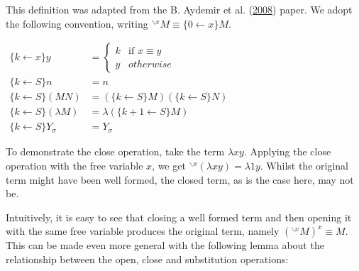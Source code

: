 \documentclass[a4paper, 12pt, twoside]{style/ociamthesis}
\theoremstyle{plain}
\theoremstyle{definition}
\newtheorem{Definition}{Definition}[chapter]
\newtheorem{Example}{Example}[chapter]
\theoremstyle{remark}
\newcommand{\cls}{{}^{\backslash x}}
\renewenvironment{Example}{\begin{OldExample}\begin{mdframed}[style=example, linecolor=yellow]}{\end{mdframed}\end{OldExample}}
\renewenvironment{Definition}{\begin{OldDefinition}\begin{mdframed}[style=example, linecolor=cyan]}{\end{mdframed}\end{OldDefinition}}
\begin{document}
\begin{Definition}[Close operation]

This definition was adapted from the B. Aydemir et al.
(\protect\hyperlink{ref-aydemir08}{2008}) paper. We adopt the following
convention, writing \(\cls M \equiv \{0 \leftarrow x\}M\).

\begin{center}
$\begin{aligned}
\{k \leftarrow x\}y &= \begin{cases}
k & \text{if }x \equiv y\\
y & otherwise
\end{cases}\\
\{k \leftarrow S\}n &= n\\
\{k \leftarrow S\}(MN) &= (\{k \leftarrow S\}M)(\{k \leftarrow S\}N)\\
\{k \leftarrow S\}(\lambda M) &= \lambda (\{k+1 \leftarrow S\}M)\\
\{k \leftarrow S\}Y_\sigma &= Y_\sigma
\end{aligned}$
\end{center}

\end{Definition}

\begin{Example}

To demonstrate the close operation, take the term \(\lambda xy\).
Applying the close operation with the free variable \(x\), we get
\(\cls (\lambda xy) = \lambda 1y\). Whilst the original term might have
been well formed, the closed term, as is the case here, may not be.

\end{Example}

Intuitively, it is easy to see that closing a well formed term and then
opening it with the same free variable produces the original term,
namely \((\cls M)^x \equiv M\). This can be made even more general with
the following lemma about the relationship between the open, close and
substitution operations:
\end{document}
